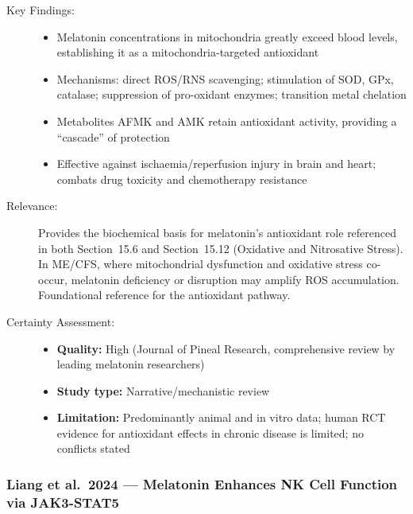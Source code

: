 \begin{description}
    \item[Key Findings:]
    \begin{itemize}
        \item Melatonin concentrations in mitochondria greatly exceed blood levels, establishing it as a mitochondria-targeted antioxidant
        \item Mechanisms: direct ROS/RNS scavenging; stimulation of SOD, GPx, catalase; suppression of pro-oxidant enzymes; transition metal chelation
        \item Metabolites AFMK and AMK retain antioxidant activity, providing a ``cascade'' of protection
        \item Effective against ischaemia/reperfusion injury in brain and heart; combats drug toxicity and chemotherapy resistance
    \end{itemize}
    \item[Relevance:] Provides the biochemical basis for melatonin's antioxidant role referenced in both Section~15.6 and Section~15.12 (Oxidative and Nitrosative Stress). In ME/CFS, where mitochondrial dysfunction and oxidative stress co-occur, melatonin deficiency or disruption may amplify ROS accumulation. Foundational reference for the antioxidant pathway.
    \item[Certainty Assessment:]
    \begin{itemize}
        \item \textbf{Quality:} High (Journal of Pineal Research, comprehensive review by leading melatonin researchers)
        \item \textbf{Study type:} Narrative/mechanistic review
        \item \textbf{Limitation:} Predominantly animal and in vitro data; human RCT evidence for antioxidant effects in chronic disease is limited; no conflicts stated
    \end{itemize}
\end{description}

\subsubsection*{Liang et al.\ 2024 --- Melatonin Enhances NK Cell Function via JAK3-STAT5}


